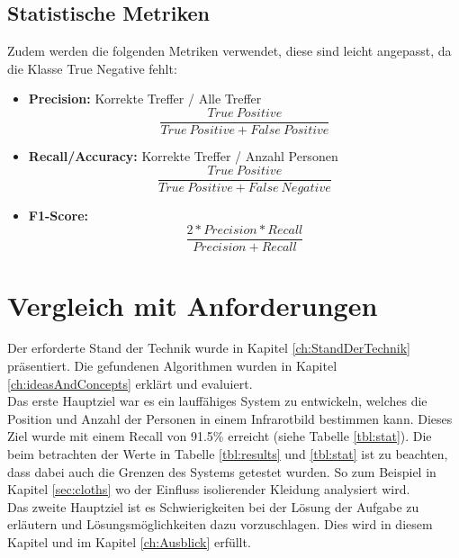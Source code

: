 \subsection{Statistische Metriken}
\noindent Zudem werden die folgenden Metriken verwendet, diese sind leicht angepasst, da die Klasse True Negative fehlt:

\begin{itemize}
	\item \textbf{Precision:} Korrekte Treffer / Alle Treffer\[\dfrac{True\: Positive}{True\: Positive + False\: Positive}\]
	\item \textbf{Recall/Accuracy:} Korrekte Treffer / Anzahl Personen\[\dfrac{True\: Positive}{True\: Positive + False\: Negative}\]
	\item \textbf{F1-Score:} \[\dfrac{2*Precision*Recall}{Precision + Recall}\]
\end{itemize}


\section{Vergleich mit Anforderungen}
\label{sec:VergleichAnforderungen}

Der erforderte Stand der Technik wurde in Kapitel \ref{ch:StandDerTechnik} präsentiert. Die gefundenen Algorithmen wurden in Kapitel \ref{ch:ideasAndConcepts} erklärt und evaluiert.\\
Das erste Hauptziel war es ein lauffähiges System zu entwickeln, welches die Position und Anzahl der Personen in einem Infrarotbild bestimmen kann. Dieses Ziel wurde mit einem Recall von 91.5\%  erreicht (siehe Tabelle \ref{tbl:stat}). Die beim betrachten der Werte in Tabelle \ref{tbl:results} und \ref{tbl:stat} ist zu beachten, dass dabei auch die Grenzen des Systems getestet wurden. So zum Beispiel in Kapitel \ref{sec:cloths} wo der Einfluss isolierender Kleidung analysiert wird.\\
Das zweite Hauptziel ist es Schwierigkeiten bei der Lösung der Aufgabe zu erläutern und Lösungsmöglichkeiten dazu vorzuschlagen. Dies wird in diesem Kapitel und im Kapitel \ref{ch:Ausblick} erfüllt.

